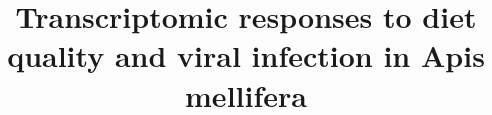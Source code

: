 \documentclass{bmcart}
\begin{document}
\begin{frontmatter}

\begin{fmbox}

\title{Transcriptomic responses to diet quality and viral infection in Apis mellifera}


\author[
   addressref={aff1},                   %
   email={lrutter@iastate.edu}   %
]{ }
\author[
   addressref={aff6},
   email={bbonning@ufl.edu}
]{ }
\author[
   addressref={aff2},
   email={dicook@monash.edu}
]{ }
\author[
   addressref={aff3,aff4},
   email={amytoth@iastate.edu}
]{ }
\author[
   addressref={aff5},
   corref={aff5},
   email={adolezal@illinois.edu}
]{ }

\address[id=aff1]{%
  ,
  ,   
  ,
}
\address[id=aff2]{%
  ,
  ,   
  ,
}

\address[id=aff3]{%
  ,
  ,   
  ,
}


\end{fmbox}
\end{frontmatter}
\end{document}
